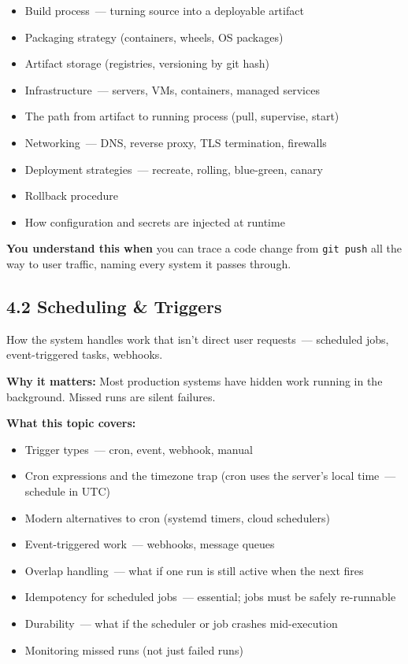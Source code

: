 \begin{itemize}
\tightlist
\item
  Build process~--- turning source into a deployable artifact
\item
  Packaging strategy (containers, wheels, OS packages)
\item
  Artifact storage (registries, versioning by git hash)
\item
  Infrastructure~--- servers, VMs, containers, managed services
\item
  The path from artifact to running process (pull, supervise, start)
\item
  Networking~--- DNS, reverse proxy, TLS termination, firewalls
\item
  Deployment strategies~--- recreate, rolling, blue-green, canary
\item
  Rollback procedure
\item
  How configuration and secrets are injected at runtime
\end{itemize}

\noindent{}\textbf{You understand this when} you can trace a code change from \texttt{git\ push} all the way to user traffic, naming every system it passes through.

\subsection*{4.2 Scheduling \& Triggers}\label{project-planning-guide:42-scheduling--triggers}

How the system handles work that isn't direct user requests~--- scheduled jobs, event-triggered tasks, webhooks.

\textbf{Why it matters:} Most production systems have hidden work running in the background. Missed runs are silent failures.

\textbf{What this topic covers:}

\begin{itemize}
\tightlist
\item
  Trigger types~--- cron, event, webhook, manual
\item
  Cron expressions and the timezone trap (cron uses the server's local time~--- schedule in UTC)
\item
  Modern alternatives to cron (systemd timers, cloud schedulers)
\item
  Event-triggered work~--- webhooks, message queues
\item
  Overlap handling~--- what if one run is still active when the next fires
\item
  Idempotency for scheduled jobs~--- essential; jobs must be safely re-runnable
\item
  Durability~--- what if the scheduler or job crashes mid-execution
\item
  Monitoring missed runs (not just failed runs)
\end{itemize}

